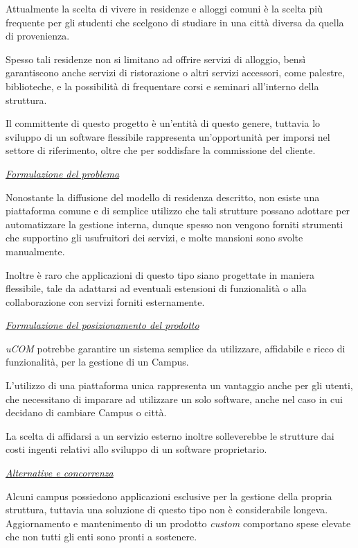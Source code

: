 Attualmente la scelta di vivere in residenze e alloggi comuni è la scelta più frequente per gli studenti che scelgono di studiare in una città diversa da quella di provenienza.

Spesso tali residenze non si limitano ad offrire servizi di alloggio, bensì garantiscono anche servizi di ristorazione o altri servizi accessori, come palestre, biblioteche, e la possibilità di frequentare corsi e seminari all'interno della struttura.

Il committente di questo progetto è un'entità di questo genere, tuttavia lo sviluppo di un software flessibile rappresenta un'opportunità per imporsi nel settore di riferimento, oltre che per soddisfare la commissione del cliente.

\underline{\textit{Formulazione del problema}}

Nonostante la diffusione del modello di residenza descritto, non esiste una piattaforma comune e di semplice utilizzo che tali strutture possano adottare per automatizzare la gestione interna, dunque spesso non vengono forniti strumenti che supportino gli usufruitori dei servizi, e molte mansioni sono svolte manualmente.

Inoltre è raro che applicazioni di questo tipo siano progettate in maniera flessibile, tale da adattarsi ad eventuali estensioni di funzionalità o alla collaborazione con servizi forniti esternamente.

\underline{\textit{Formulazione del posizionamento del prodotto}}

\textit{uCOM} potrebbe garantire un sistema semplice da utilizzare, affidabile e ricco di funzionalità, per la gestione di un Campus. 

L'utilizzo di una piattaforma unica rappresenta un vantaggio anche per gli utenti, che necessitano di imparare ad utilizzare un solo software, anche nel caso in cui decidano di cambiare Campus o città.

La scelta di affidarsi a un servizio esterno inoltre solleverebbe le strutture dai costi ingenti relativi allo sviluppo di un software proprietario.

\underline{\textit{Alternative e concorrenza}}

Alcuni campus possiedono applicazioni esclusive per la gestione della propria struttura, tuttavia una soluzione di questo tipo non è considerabile longeva. Aggiornamento e mantenimento di un prodotto \textit{custom} comportano spese elevate che non tutti gli enti sono pronti a sostenere.

